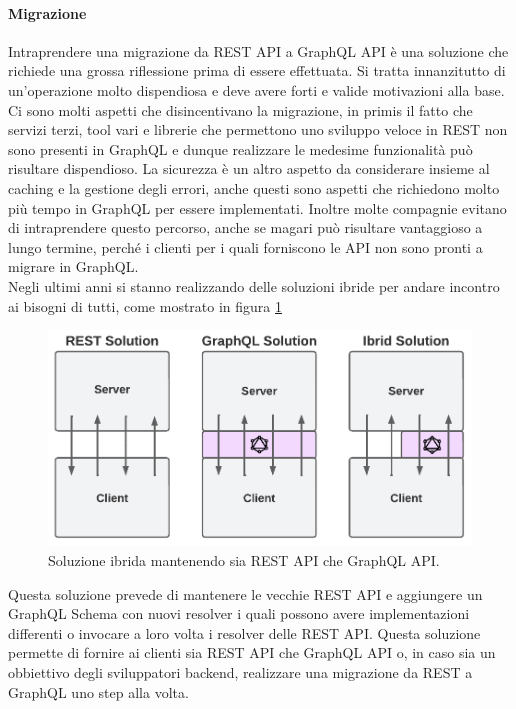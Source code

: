 \paragraph{Migrazione}
Intraprendere una migrazione da REST API a GraphQL API è una soluzione che richiede una grossa riflessione prima di essere effettuata. Si tratta innanzitutto di un'operazione molto dispendiosa e deve avere forti e valide motivazioni alla base. Ci sono molti aspetti che disincentivano la migrazione, in primis il fatto che servizi terzi, tool vari e librerie che permettono uno sviluppo veloce in REST non sono presenti in GraphQL e dunque realizzare le medesime funzionalità può risultare dispendioso. La sicurezza è un altro aspetto da considerare insieme al caching e la gestione degli errori, anche questi sono aspetti che richiedono molto più tempo in GraphQL per essere implementati. Inoltre molte compagnie evitano di intraprendere questo percorso, anche se magari può risultare vantaggioso a lungo termine, perché i clienti per i quali forniscono le API non sono pronti a migrare in GraphQL.\\
Negli ultimi anni si stanno realizzando delle soluzioni ibride per andare incontro ai bisogni di tutti, come mostrato in figura \ref{ibrid-solution}
\FloatBarrier
\begin{figure}[!ht]
\centering
\includegraphics[width=0.8\linewidth]{immagini/ibridSolution.pdf}
\caption{Soluzione ibrida mantenendo sia REST API che GraphQL API.}
\label{ibrid-solution}
\end{figure}
\FloatBarrier
Questa soluzione prevede di mantenere le vecchie REST API e aggiungere un GraphQL Schema con nuovi resolver i quali possono avere implementazioni differenti o invocare a loro volta i resolver delle REST API. Questa soluzione permette di fornire ai clienti sia REST API che GraphQL API o, in caso sia un obbiettivo degli sviluppatori backend, realizzare una migrazione da REST a GraphQL uno step alla volta.
\newpage
